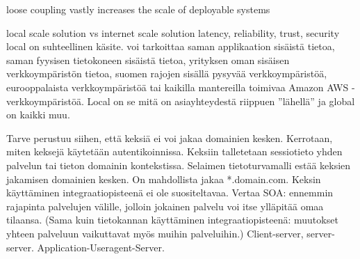 \documentclass[finnish,gradu]{tktltiki}
\begin{document}
  loose coupling vastly increases the scale of deployable systems

  local scale solution vs internet scale solution
  latency, reliability, trust, security
  local on suhteellinen käsite. voi tarkoittaa saman applikaation sisäistä tietoa, saman fyysisen tietokoneen sisäistä tietoa, yrityksen oman sisäisen verkkoympäristön tietoa, suomen rajojen sisällä pysyvää verkkoympäristöä, eurooppalaista verkkoympäristöä tai kaikilla mantereilla toimivaa Amazon AWS -verkkoympäristöä. Local on se mitä on asiayhteydestä riippuen ''lähellä'' ja global on kaikki muu.

  Tarve perustuu siihen, että keksiä ei voi jakaa domainien kesken. Kerrotaan, miten keksejä käytetään autentikoinnissa. Keksiin talletetaan sessiotieto yhden palvelun tai tieton domainin kontekstissa. Selaimen tietoturvamalli estää keksien jakamisen domainien kesken. On mahdollista
jakaa *.domain.com. Keksin käyttäminen integraatiopisteenä ei ole suositeltavaa. Vertaa SOA:
ennemmin rajapinta palvelujen välille, jolloin jokainen palvelu voi itse ylläpitää omaa tilaansa.
(Sama kuin tietokannan käyttäminen integraatiopisteenä: muutokset yhteen palveluun vaikuttavat
myös muihin palveluihin.) Client-server, server-server. Application-Useragent-Server.
\end{document}
